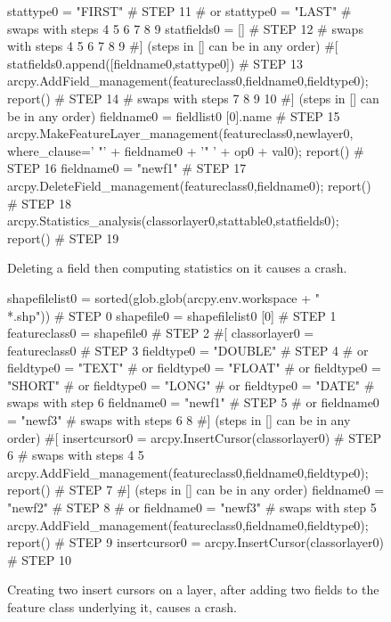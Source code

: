 \begin{figure}
{\begin{code}
stattype0 = "FIRST"                                                                  \# STEP 11
\#  or stattype0 = "LAST" 
\#  swaps with steps 4 5 6 7 8 9
statfields0 = []                                                                     \# STEP 12
\#  swaps with steps 4 5 6 7 8 9
\#] (steps in [] can be in any order)
\#[
statfields0.append([fieldname0,stattype0])                                           \# STEP 13
arcpy.AddField\_management(featureclass0,fieldname0,fieldtype0); report()             \# STEP 14
\#  swaps with steps 7 8 9 10
\#] (steps in [] can be in any order)
fieldname0 = fieldlist0 [0].name \# STEP 15
arcpy.MakeFeatureLayer\_management(featureclass0,newlayer0,
   where\_clause=' "' + fieldname0 + '" ' + op0 + val0); report()                     \# STEP 16
fieldname0 = "newf1"                                                                 \# STEP 17
arcpy.DeleteField\_management(featureclass0,fieldname0); report()                     \# STEP 18
arcpy.Statistics\_analysis(classorlayer0,stattable0,statfields0); report()            \# STEP 19
\end{code}
}
\caption{Deleting a field then computing statistics on it causes a crash.}
\label{fault2}
\end{figure}

\begin{figure}
{\scriptsize 
\begin{code}
shapefilelist0 = sorted(glob.glob(arcpy.env.workspace + "\\*.shp"))                   \# STEP 0
shapefile0 = shapefilelist0 [0]                                                      \# STEP 1
featureclass0 = shapefile0                                                           \# STEP 2
\#[
classorlayer0 = featureclass0                                                        \# STEP 3
fieldtype0 = "DOUBLE"                                                                \# STEP 4
\#  or fieldtype0 = "TEXT"
\#  or fieldtype0 = "FLOAT"
\#  or fieldtype0 = "SHORT"
\#  or fieldtype0 = "LONG"
\#  or fieldtype0 = "DATE"
\#  swaps with step 6
fieldname0 = "newf1"                                                                 \# STEP 5
\#  or fieldname0 = "newf3"
\#  swaps with steps 6 8
\#] (steps in [] can be in any order)
\#[
insertcursor0 = arcpy.InsertCursor(classorlayer0)                                    \# STEP 6
\#  swaps with steps 4 5
arcpy.AddField\_management(featureclass0,fieldname0,fieldtype0); report()             \# STEP 7
\#] (steps in [] can be in any order)
fieldname0 = "newf2"                                                                 \# STEP 8
\#  or fieldname0 = "newf3"
\#  swaps with step 5
arcpy.AddField\_management(featureclass0,fieldname0,fieldtype0); report()             \# STEP 9
insertcursor0 = arcpy.InsertCursor(classorlayer0)                                    \# STEP 10
\end{code}
}
\caption{Creating two insert cursors on a layer, after adding two fields to the feature class underlying it, causes a crash.}
\label{fault3}
\end{figure}

